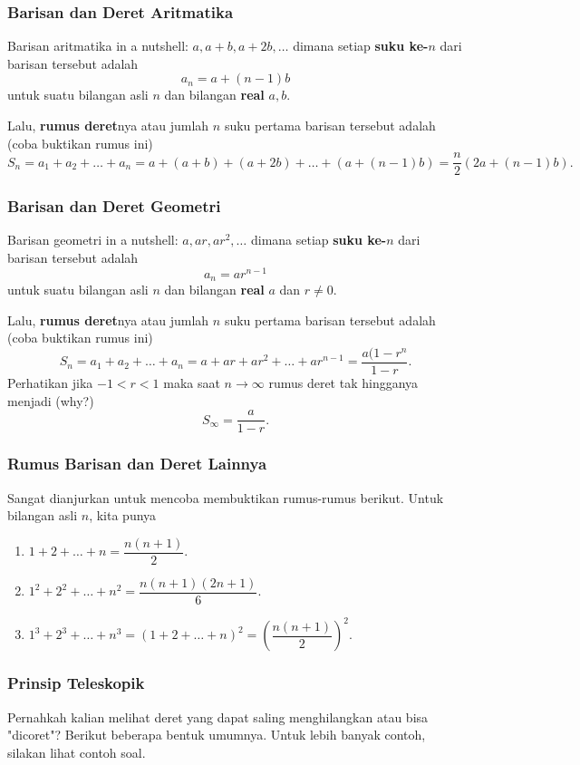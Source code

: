     
    \subsubsection{Barisan dan Deret Aritmatika}
    Barisan aritmatika in a nutshell: $a,a+b,a+2b,\dots$ dimana setiap \textbf{suku ke-$n$} dari barisan tersebut adalah $$a_n=a+(n-1)b$$ untuk suatu bilangan asli $n$ dan bilangan \textbf{real} $a,b$.
    
    Lalu, \textbf{rumus deret}nya atau jumlah $n$ suku pertama barisan tersebut adalah (coba buktikan rumus ini) $$S_n = a_1+a_2+\dots+a_n=a+(a+b)+(a+2b)+\dots+(a+(n-1)b)=\dfrac{n}{2}(2a+(n-1)b).$$
    
    \subsubsection{Barisan dan Deret Geometri}
     Barisan geometri in a nutshell: $a,ar,ar^2,\dots$ dimana setiap \textbf{suku ke-$n$} dari barisan tersebut adalah $$a_n=ar^{n-1}$$ untuk suatu bilangan asli $n$ dan bilangan \textbf{real} $a$ dan $r \neq 0$.
    
    Lalu, \textbf{rumus deret}nya atau jumlah $n$ suku pertama barisan tersebut adalah (coba buktikan rumus ini) $$S_n = a_1+a_2+\dots+a_n=a+ar+ar^2+\dots+ar^{n-1}=\dfrac{a(1-r^n}{1-r}.$$
    Perhatikan jika $-1 < r < 1$ maka saat $n \rightarrow \infty$ rumus deret tak hingganya menjadi (why?) $$S_\infty =  \dfrac{a}{1-r}.$$
    
    \subsubsection{Rumus Barisan dan Deret Lainnya}
    Sangat dianjurkan untuk mencoba membuktikan rumus-rumus berikut. Untuk bilangan asli $n$, kita punya
    \begin{enumerate}
        \item $1+2+\dots+n = \dfrac{n(n+1)}{2}.$
        \item $1^2+2^2+\dots+n^2 = \dfrac{n(n+1)(2n+1)}{6}.$
        \item $1^3+2^3+\dots+n^3 = \left(1+2+\dots+n\right)^2= \left(\dfrac{n(n+1)}{2}\right)^2.$
    \end{enumerate}
    
    \subsubsection{Prinsip Teleskopik}
    Pernahkah kalian melihat deret yang dapat saling menghilangkan atau bisa "dicoret"? Berikut beberapa bentuk umumnya. Untuk lebih banyak contoh, silakan lihat contoh soal.
    
